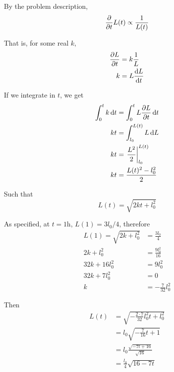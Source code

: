 \setlength{\columnseprule}{0.4pt}
\raggedcolumns\begin{multicols}{2}
    By the problem description, \[
        \pdv{t} L(t) \propto \frac{1}{L(t)}
    \]

    That is, for some real $k$,
    \begin{align*}
        \pdv{L}{t} &= k \frac{1}{L} \\
        k &= L \dv{L}{t}
    \end{align*}

    If we integrate in $t$, we get
    \begin{align*}
        \int_0^t k \dd{t} &= \int_0^t L \pdv{L}{t} \dd{t} \\
        k t &= \int_{l_0}^{L(t)} L \dd{L} \\
        k t &= \eval{\frac{L^2}{2}}_{l_0}^{L(t)} \\
        k t &= \frac{L(t)^2 - l_0^2}{2}
    \end{align*}

    Such that \[
        L(t) = \sqrt{2 k t + l_0^2}
    \]

    As specified, at $t = 1 \text{h}$, $L(1) = 3 l_0 / 4$, therefore
    \begin{align*}
        L(1) = \sqrt{2 k + l_0^2} &= \frac{3 l_0}{4} \\
            2 k + l_0^2 &= \frac{9 l_0^2}{16} \\
            32 k + 16 l_0^2 &= 9 l_0^2 \\
            32 k + 7 l_0^2 &= 0 \\
            k &= - \frac{7}{32} l_0^2
    \end{align*}

    Then \begin{align*}
        L(t) &= \sqrt{- \frac{2 \cdot 7}{32} l_0^2 t + l_0^2} \\
            &= l_0 \sqrt{- \frac{7}{16} t + 1} \\
            &= l_0 \frac{\sqrt{- 7 t + 16}}{\sqrt{16}} \\
            &= \frac{l_0}{4} \sqrt{16 - 7 t}
    \end{align*}
\end{multicols}
\setlength{\columnseprule}{0pt}

